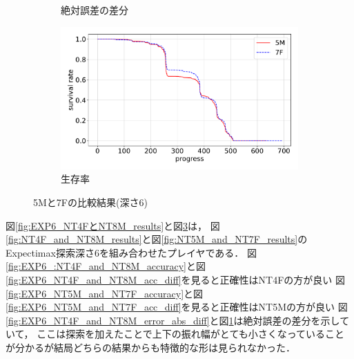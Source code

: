 \begin{figure}[t]
\begin{subfigure}[b]{0.49\linewidth}
    \caption{絶対誤差の差分}
    \label{fig:EXP6_NT5M_and_NT7F_error_abs_diff}
\end{subfigure}
\begin{subfigure}[b]{0.49\linewidth}
    \includegraphics[width=\linewidth]{pdf/compare/EXP6_NT5M_and_NT7F/survival.pdf}
    \caption{生存率}
    \label{fig:EXP6_NT5M_and_NT7F_survival}
\end{subfigure}
\caption{5Mと7Fの比較結果(深さ6)}
\label{fig:EXP6_NT5M_and_NT7F_results}
\end{figure}

図\ref{fig:EXP6_NT4FとNT8M_results}と図\ref{fig:EXP6_NT5M_and_NT7F_results}は，
図\ref{fig:NT4F_and_NT8M_results}と図\ref{fig:NT5M_and_NT7F_results}のExpectimax探索深さ6を組み合わせたプレイヤである．
図\ref{fig:EXP6_:NT4F_and_NT8M_accuracy}と図\ref{fig:EXP6_NT4F_and_NT8M_acc_diff}を見ると正確性はNT4Fの方が良い
図\ref{fig:EXP6_NT5M_and_NT7F_accuracy}と図\ref{fig:EXP6_NT5M_and_NT7F_acc_diff}を見ると正確性はNT5Mの方が良い
図\ref{fig:EXP6_NT4F_and_NT8M_error_abs_diff}と図\ref{fig:EXP6_NT5M_and_NT7F_error_abs_diff}は絶対誤差の差分を示していて，
ここは探索を加えたことで上下の振れ幅がとても小さくなっていることが分かるが結局どちらの結果からも特徴的な形は見られなかった．
